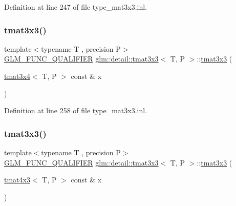 Definition at line 247 of file type\+\_\+mat3x3.\+inl.

\mbox{\label{structglm_1_1detail_1_1tmat3x3_a3c9ff04e39cb4cd6d0b4710683d7ab8c}} 
\subsubsection{\texorpdfstring{tmat3x3()}{tmat3x3()}\hspace{0.1cm}{\footnotesize\ttfamily [17/22]}}
{\footnotesize\ttfamily template$<$typename T , precision P$>$ \\
\hyperlink{setup_8hpp_a33fdea6f91c5f834105f7415e2a64407}{G\+L\+M\+\_\+\+F\+U\+N\+C\+\_\+\+Q\+U\+A\+L\+I\+F\+I\+ER} \hyperlink{structglm_1_1detail_1_1tmat3x3}{glm\+::detail\+::tmat3x3}$<$ T, P $>$\+::\hyperlink{structglm_1_1detail_1_1tmat3x3}{tmat3x3} (\begin{DoxyParamCaption}\item[{\hyperlink{structglm_1_1detail_1_1tmat3x4}{tmat3x4}$<$ T, P $>$ const \&}]{x }\end{DoxyParamCaption})\hspace{0.3cm}{\ttfamily [explicit]}}



Definition at line 258 of file type\+\_\+mat3x3.\+inl.

\mbox{\label{structglm_1_1detail_1_1tmat3x3_a3c3870ea513e58b0a44ca5e6abedcc71}} 
\subsubsection{\texorpdfstring{tmat3x3()}{tmat3x3()}\hspace{0.1cm}{\footnotesize\ttfamily [18/22]}}
{\footnotesize\ttfamily template$<$typename T , precision P$>$ \\
\hyperlink{setup_8hpp_a33fdea6f91c5f834105f7415e2a64407}{G\+L\+M\+\_\+\+F\+U\+N\+C\+\_\+\+Q\+U\+A\+L\+I\+F\+I\+ER} \hyperlink{structglm_1_1detail_1_1tmat3x3}{glm\+::detail\+::tmat3x3}$<$ T, P $>$\+::\hyperlink{structglm_1_1detail_1_1tmat3x3}{tmat3x3} (\begin{DoxyParamCaption}\item[{\hyperlink{structglm_1_1detail_1_1tmat4x3}{tmat4x3}$<$ T, P $>$ const \&}]{x }\end{DoxyParamCaption})\hspace{0.3cm}{\ttfamily [explicit]}}



